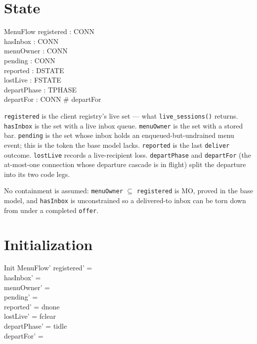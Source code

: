 \documentclass[a4paper,10pt,fleqn]{article}
\begin{document}
\section{State}

\begin{schema}{MenuFlow}
  registered : \power CONN \\
  hasInbox : \power CONN \\
  menuOwner : \power CONN \\
  pending : \power CONN \\
  reported : DSTATE \\
  lostLive : FSTATE \\
  departPhase : TPHASE \\
  departFor : \power CONN
\where
  \# departFor 
\end{schema}

\texttt{registered} is the client registry's live set --- what
\texttt{live\_sessions()} returns. \texttt{hasInbox} is the set with a live
inbox queue. \texttt{menuOwner} is the set with a stored bar.
\texttt{pending} is the set whose inbox holds an enqueued-but-undrained menu
event; this is the token the base model lacks. \texttt{reported} is the last
\texttt{deliver} outcome. \texttt{lostLive} records a live-recipient loss.
\texttt{departPhase} and \texttt{departFor} (the at-most-one connection whose
departure cascade is in flight) split the departure into its two code legs.

No containment is assumed: \texttt{menuOwner} $\subseteq$ \texttt{registered}
is MO, proved in the base model, and \texttt{hasInbox} is unconstrained so a
delivered-to inbox can be torn down from under a completed \texttt{offer}.

\section{Initialization}

\begin{schema}{Init}
  MenuFlow'
\where
  registered' = \emptyset \\
  hasInbox' = \emptyset \\
  menuOwner' = \emptyset \\
  pending' = \emptyset \\
  reported' = dnone \\
  lostLive' = fclear \\
  departPhase' = tidle \\
  departFor' = \emptyset
\end{schema}
\end{document}
